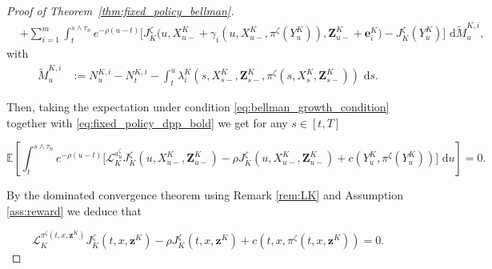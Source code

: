\documentclass[11pt]{article}
\theoremstyle{remarkitalic}
\theoremstyle{remarkitalic}
\newcommand{\dd}{\,\mathrm d}
\newcommand{\1}{\mathbf 1}
\begin{document}
\begin{proof}[Proof of Theorem~\ref{thm:fixed_policy_bellman}]
\begin{align*}
    &
    +
    \sum_{i=1}^m
    \int_t^{s\wedge\tau_n}
    \!e^{-\rho(u-t)}
    \Bigg[
        J_K^\zeta
        \Big(
            u,
            X_{u-}^K
            +
            \gamma_i
            \left(
                u,X_{u-}^K,\pi^\zeta(Y_u^K)
            \right),
            \mathbf Z_{u-}^K\!+\!\mathbf e_i^K
        \Big)
        -
        J_K^\zeta
        \left(
           Y_u^K
        \right)
    \Bigg]
    \,\dd\widetilde M_u^{K,i},
\end{align*} 
with 
\begin{align*}
    \widetilde M_u^{K,i}
    &:=
    N_u^{K,i}-N_t^{K,i}
    -
    \int_t^u
    \lambda_i^K
    \left(
        s,X_{s-}^K,\mathbf Z_{s-}^K,\pi^\zeta(s,X_s^K,\mathbf Z_{s-}^K)
    \right)
    \,\dd s.
\end{align*}

Then, taking the expectation under condition \eqref{eq:bellman_growth_condition} together with \eqref{eq:fixed_policy_dpp_bold} we get for any $s\in [t,T]$

\[\mathbb E\left[\int_t^{s\wedge\tau_n}
    e^{-\rho(u-t)}
    \Bigg[
        \mathcal L_K^{a_u^\zeta}
        J_K^\zeta
        \left(
            u,X_{u-}^K,\mathbf Z_{u-}^K
        \right)
        -
        \rho
        J_K^\zeta
        \left(
            u,X_{u-}^K,\mathbf Z_{u-}^K
        \right) +
        c\left(
            Y_u^K,\pi^\zeta(Y_u^K)
        \right)
    \Bigg] \,\dd u\right]=0.\] 

By the dominated convergence theorem using Remark \ref{rem:LK} and Assumption \ref{ass:reward} we deduce that 

\[\mathcal L_K^{
        \pi^\zeta(t,x,\mathbf z^K)
    }
    J_K^\zeta(t,x,\mathbf z^K)
    -
    \rho J_K^\zeta(t,x,\mathbf z^K)
    +
    c\left(
        t,x,
        \pi^\zeta(t,x,\mathbf z^K)
    \right)
    =
    0.\]


\end{proof}
\end{document}
